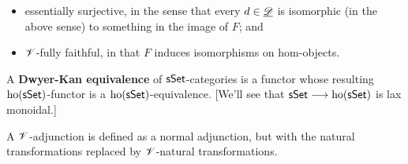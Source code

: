 \documentclass[11pt]{article}
\begin{document}
\begin{4. Basic concepts in enriched category theory}
\begin{itemise}
\begin{itemize}
\setlength{\parindent}{.25in}
\item essentially surjective, in the sense that every $d\in\underline{\mathscr{D}}$ is isomorphic (in the above sense) to something in the image of $F$; and
\item $\mathscr{V}$-fully faithful, in that $F$ induces isomorphisms on hom-objects.
\end{itemize}
A \textbf{Dwyer-Kan equivalence} of $\operatorname{{\mathsf{sSet}}}$-categories is a functor whose resulting $\textup{ho}(\operatorname{{\mathsf{sSet}}})$-functor is a $\textup{ho}(\operatorname{{\mathsf{sSet}}})$-equivalence. [We'll see that $\operatorname{{\mathsf{sSet}}}\longrightarrow\textup{ho}(\operatorname{{\mathsf{sSet}}})$ is lax monoidal.]
\item A $\mathscr{V}$-adjunction is defined as a normal adjunction, but with the natural transformations replaced by $\mathscr{V}$-natural transformations.
\end{itemise}
\end{4. Basic concepts in enriched category theory}
\end{document}
